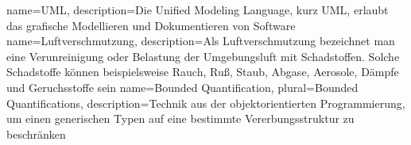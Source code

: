 {
	name=UML,
	description={Die Unified Modeling Language, kurz UML, erlaubt das grafische Modellieren und Dokumentieren von Software}
}
{
	name=Luftverschmutzung,
	description={Als Luftverschmutzung bezeichnet man eine Verunreinigung oder Belastung der Umgebungsluft mit Schadstoffen. Solche Schadstoffe können beispielsweise  Rauch, Ruß, Staub, Abgase, Aerosole, Dämpfe und Geruchsstoffe sein}
}
{
    name=Bounded Quantification,
    plural=Bounded Quantifications,
    description={Technik aus der objektorientierten Programmierung, um einen generischen Typen auf eine bestimmte Vererbungsstruktur zu beschränken}
}
